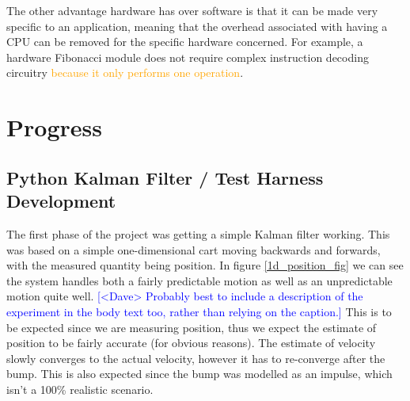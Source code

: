 \documentclass[12pt]{article}
\newcommand{\note}[2][red]{\textcolor{#1}{#2}}
\newcommand{\notedme}[1]{\note[blue]{[<Dave> #1]}}
\newcommand{\change}[2][]{\textcolor{orange}{#2}}
\begin{document}
The other advantage hardware has over software is that it can be made very specific to an application, meaning that the overhead associated with having a CPU can be removed for the specific hardware concerned. For example, a hardware Fibonacci module does not require complex instruction decoding circuitry \change{because it only performs one operation}.

\section{Progress}

\subsection{Python Kalman Filter / Test Harness Development}

The first phase of the project was getting a simple Kalman filter working. This was based on a simple one-dimensional cart moving backwards and forwards, with the measured quantity being position. In figure \ref{1d_position_fig} we can see the system handles both a fairly predictable motion as well as an unpredictable motion quite well. 
\notedme{Probably best to include a description of the experiment in the body text too, rather than relying on the caption.}
This is to be expected since we are measuring position, thus we expect the estimate of position to be fairly accurate (for obvious reasons). The estimate of velocity slowly converges to the actual velocity, however it has to re-converge after the bump. This is also expected since the bump was modelled as an impulse, which isn't a 100\% realistic scenario.
\end{document}
